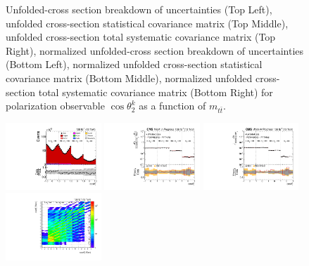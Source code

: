 \begin{figure}[htb]
\begin{center}
\caption{Unfolded-cross section breakdown of uncertainties (Top Left), unfolded cross-section statistical covariance matrix (Top Middle), unfolded cross-section total systematic covariance matrix (Top Right), normalized unfolded-cross section breakdown of uncertainties (Bottom Left), normalized unfolded cross-section statistical covariance matrix (Bottom Middle), normalized unfolded cross-section total systematic covariance matrix (Bottom Right) for polarization observable $\cos\theta_{2}^{k}$ as a function of $m_{t\bar{t}}$.}
\label{fig:b2k_mttbar_uncertainties}
\end{center}
\end{figure}
\clearpage
\begin{figure}[htb]
\begin{center}
 \includegraphics[width=0.32\textwidth]{fig_fullRun2UL/controlplots/combined/Hyp_AntiLeptonBn_vs_TTBarMass.pdf}
 \includegraphics[width=0.32\textwidth]{fig_fullRun2UL/unfolding/combined/UnfoldedResults_b1n_mttbar.pdf}
 \includegraphics[width=0.32\textwidth]{fig_fullRun2UL/unfolding/combined/UnfoldedResultsNorm_b1n_mttbar.pdf} \\
 \includegraphics[width=0.32\textwidth]{fig_fullRun2UL/unfolding/combined/ResponseMatrix_b1n_mttbar.pdf}

\end{center}
\end{figure}
